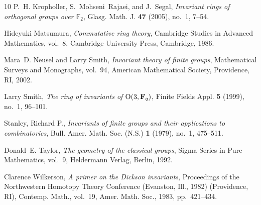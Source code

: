 \documentclass{amsart}
\begin{document}
\begin{thebibliography}{10}
P.~H. Kropholler, S.~Mohseni~Rajaei, and J.~Segal, \emph{Invariant rings of
  orthogonal groups over {$\mathbb F_2$}}, Glasg. Math. J. \textbf{47} (2005),
  no.~1, 7--54. 


Hideyuki Matsumura, \emph{Commutative ring theory}, Cambridge Studies in
  Advanced Mathematics, vol.~8, Cambridge University Press, Cambridge, 1986.


Mara~D. Neusel and Larry Smith, \emph{Invariant theory of finite groups},
  Mathematical Surveys and Monographs, vol.~94, American Mathematical Society,
  Providence, RI, 2002. 

Larry Smith, \emph{The ring of invariants of {${\rm O}(3,{\bf F}_q)$}}, Finite
  Fields Appl. \textbf{5} (1999), no.~1, 96--101. 

    Stanley, Richard P., \emph{Invariants of finite groups and their applications to combinatorics},
    Bull. Amer. Math. Soc. (N.S.)
    \textbf{1} (1979), no.~1, 475--511. 
 
Donald~E. Taylor, \emph{The geometry of the classical groups}, Sigma Series in
  Pure Mathematics, vol.~9, Heldermann Verlag, Berlin, 1992. 

Clarence Wilkerson, \emph{A primer on the {D}ickson invariants}, Proceedings of
  the Northwestern Homotopy Theory Conference (Evanston, Ill., 1982)
  (Providence, RI), Contemp. Math., vol.~19, Amer. Math. Soc., 1983,
  pp.~421--434. 
\end{thebibliography}
\end{document}
